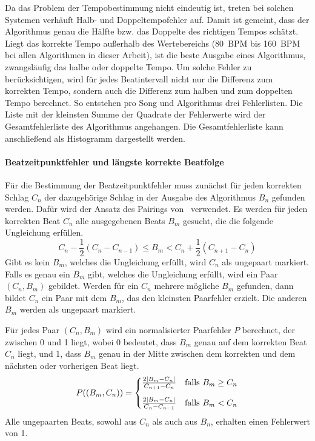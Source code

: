 {{{			%
			Da das Problem der Tempobestimmung nicht eindeutig ist,
				treten bei solchen Systemen verhäuft Halb- und Doppeltempofehler auf.
			Damit ist gemeint,
				dass der Algorithmus genau die Hälfte bzw. das Doppelte des richtigen Tempos schätzt.
			Liegt das korrekte Tempo au{\ss}erhalb des Wertebereichs
				(\SI{80}{\ac{BPM}} bis \SI{160}{\ac{BPM}} bei allen Algorithmen in dieser Arbeit),
				ist die beste Ausgabe eines Algorithmus,
				zwangsläufig das halbe oder doppelte Tempo.
			Um solche Fehler zu berücksichtigen,
				wird für jedes Beatintervall nicht nur die Differenz zum korrekten Tempo,
				sondern auch die Differenz zum halben und zum doppelten Tempo berechnet.
			So entstehen pro Song und Algorithmus drei Fehlerlisten.
			Die Liste mit der kleinsten Summe der Quadrate der Fehlerwerte wird der Gesamtfehlerliste des Algorithmus angehangen.
			Die Gesamtfehlerliste kann anschlie{\ss}end als Histogramm dargestellt werden.
		}

		\paragraph{Beatzeitpunktfehler und längste korrekte Beatfolge}
		{
			Für die Bestimmung der Beatzeitpunktfehler muss zunächst
				für jeden korrekten Schlag $C_n$ der dazugehörige Schlag in der Ausgabe des Algorithmus $B_n$ gefunden werden.
			Dafür wird der Ansatz des Pairings von~\cite{1997_GoMu1} verwendet.
			Es werden für jeden korrekten Beat $C_n$ alle ausgegebenen Beats $B_m$ gesucht,
				die die folgende Ungleichung erfüllen.
			\begin{equation}
				C_n - \frac{1}{2}(C_n - C_{n - 1}) \le B_m < C_n + \frac{1}{2}(C_{n + 1} - C_n)
			\end{equation}
			Gibt es kein $B_m$,
				welches die Ungleichung erfüllt,
				wird $C_n$ als ungepaart markiert.
			Falls es genau ein $B_m$ gibt,
				welches die Ungleichung erfüllt,
				wird ein Paar $(C_n, B_m)$ gebildet.
			Werden für ein $C_n$ mehrere mögliche $B_m$ gefunden,
				dann bildet $C_n$ ein Paar mit dem $B_m$,
				das den kleinsten Paarfehler erzielt.
			Die anderen $B_m$ werden als ungepaart markiert.

			Für jedes Paar $(C_n, B_m)$ wird ein normalisierter Paarfehler $P$ berechnet,
				der zwischen \num{0} und \num{1} liegt,
				wobei \num{0} bedeutet,
				dass $B_m$ genau auf dem korrekten Beat $C_n$ liegt,
				und \num{1},
				dass $B_m$ genau in der Mitte zwischen dem korrekten und dem nächsten oder vorherigen Beat liegt.
			\begin{equation}
				P((B_m, C_n)) =
					\begin{cases}
						\frac{2|B_m - C_n|}{C_{n + 1} - C_n} & \text{falls } B_m \ge C_n \vspace{3mm} \\
						\frac{2|B_m - C_n|}{C_n - C_{n - 1}} & \text{falls } B_m  <  C_n
					\end{cases}
			\end{equation}
			Alle ungepaarten Beats,
				sowohl aus $C_n$ als auch aus $B_n$,
				erhalten einen Fehlerwert von \num{1}.

}}}
